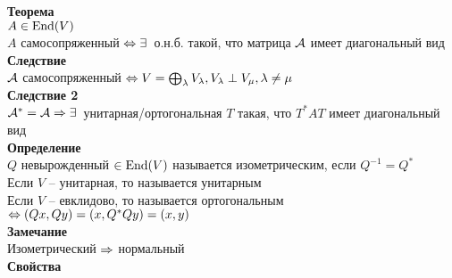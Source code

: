\documentclass[12pt]{article}
\begin{document}
\textbf{Теорема}\\
$A \in \operatorname{End}(V)$\\
$A$ самосопряженный $\Leftrightarrow \exists\,$ о.н.б. такой, что матрица $\mathcal{A}$ имеет диагональный вид\\
\textbf{Следствие}\\
$\mathcal{A}$ самосопряженный $\Leftrightarrow V = \bigoplus_\lambda V_\lambda, V_\lambda \perp V_\mu, \lambda \neq \mu$\\
\textbf{Следствие 2}\\
$\mathcal{A}^* = \mathcal{A} \Rightarrow \exists\,$ унитарная/ортогональная $T$ такая, что $T^*AT$ имеет диагональный вид\\
\textbf{Определение}\\
$Q$ невырожденный $\in \operatorname{End}(V)$ называется изометрическим, если $Q^{-1} = Q^*$\\
Если $V$ -- унитарная, то называется унитарным\\
Если $V$ -- евклидово, то называется ортогональным\\
$\Leftrightarrow (Qx, Qy) = (x, Q^*Qy) = (x,y)$\\
\textbf{Замечание}\\
Изометрический $\Rightarrow$ нормальный\\
\textbf{Свойства}
\end{document}
